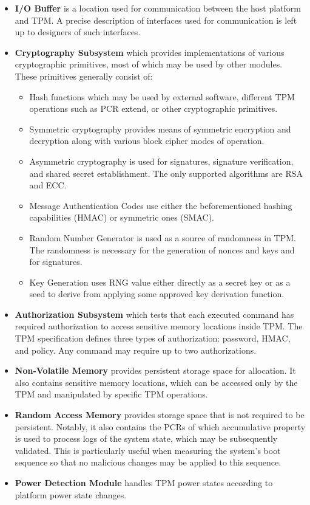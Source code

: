 \begin{itemize}

\item \textbf{I/O Buffer} is a location used for communication between the host platform and TPM. A precise description of interfaces used for communication is left up to designers of such interfaces.

\item \textbf{Cryptography Subsystem} which provides implementations of various cryptographic primitives, most of which may be used by other modules. These primitives generally consist of: 
\begin{itemize}
    \item Hash functions which may be used by external software, different TPM operations such as PCR extend, or other cryptographic primitives. 
    \item Symmetric cryptography provides means of symmetric encryption and decryption along with various block cipher modes of operation.
    \item Asymmetric cryptography is used for signatures, signature verification, and shared secret establishment. The only supported algorithms are RSA and ECC.
    \item Message Authentication Codes use either the beforementioned hashing capabilities (HMAC) or symmetric ones (SMAC).
    \item Random Number Generator is used as a source of randomness in TPM. The randomness is necessary for the generation of nonces and keys and for signatures. 
    \item Key Generation uses RNG value either directly as a secret key or as a seed to derive from applying some approved key derivation function.
\end{itemize}

\item \textbf{Authorization Subsystem} which tests that each executed command has required authorization to access sensitive memory locations inside TPM. The TPM specification \cite{tcg_p1_architecture} defines three types of authorization: password, HMAC, and policy. Any command may require up to two authorizations.

\item \textbf{Non-Volatile Memory} provides persistent storage space for allocation. It also contains sensitive memory locations, which can be accessed only by the TPM and manipulated by specific TPM operations.

\item \textbf{Random Access Memory} provides storage space that is not required to be persistent. Notably, it also contains the PCRs of which accumulative property is used to process logs of the system state, which may be subsequently validated. This is particularly useful when measuring the system's boot sequence so that no malicious changes may be applied to this sequence.

\item \textbf{Power Detection Module} handles TPM power states according to platform power state changes.
\end{itemize}

